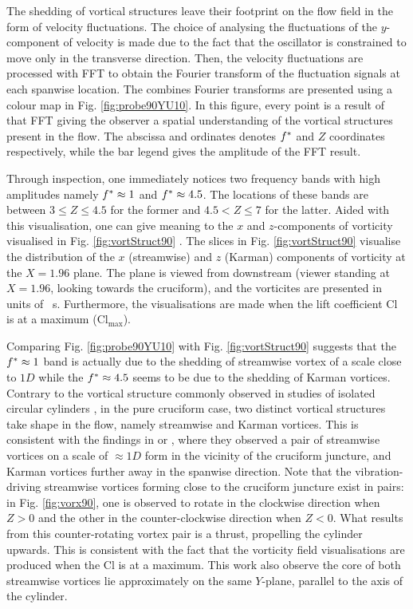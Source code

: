 \documentclass[oneside]{utmthesis}
\begin{document}
The shedding of vortical structures leave their footprint on the flow field in the form of velocity fluctuations. The choice of analysing the fluctuations of the $y$-component of velocity is made due to the fact that the oscillator is constrained to move only in the transverse direction. Then, the velocity fluctuations are processed with FFT to obtain the Fourier transform of the fluctuation signals at each spanwise location. The combines Fourier transforms are presented using a colour map in Fig. \ref{fig:probe90YU10}. In this figure, every point is a result of that FFT giving the observer a spatial understanding of the vortical structures present in the flow. The abscissa and ordinates denotes $f^{*}$ and $Z$ coordinates respectively, while the bar legend gives the amplitude of the FFT result.

Through inspection, one immediately notices two frequency bands with high amplitudes namely $f^{*} \approx 1$ and $f^{*} \approx 4.5$. The locations of these bands are between $3 \leq Z \leq 4.5$ for the former and $4.5 < Z \leq 7$ for the latter. Aided with this visualisation, one can give meaning to the $x$ and $z$-components of vorticity visualised in Fig. \ref{fig:vortStruct90} . The slices in Fig. \ref{fig:vortStruct90} visualise the distribution of the $x$ (streamwise) and $z$ (Karman) components of vorticity at the $X = 1.96$ plane. The plane is viewed from downstream (viewer standing at $X = 1.96$, looking towards the cruciform), and the vorticites are presented in units of \si{\per\second}. Furthermore, the visualisations are made when the lift coefficient Cl is at a maximum ($\text{Cl}_{\text{max}}$).

Comparing Fig. \ref{fig:probe90YU10} with Fig. \ref{fig:vortStruct90} suggests that the $f^{*} \approx 1$ band is actually due to the shedding of streamwise vortex of a scale close to $1D$ while the $f^{*} \approx 4.5$ seems to be due to the shedding of Karman vortices. Contrary to the vortical structure commonly observed in studies of isolated circular cylinders \citep{Deng2007,Kinaci2016,Duranay2020}, in the pure cruciform case, two distinct vortical structures take shape in the flow, namely streamwise and Karman vortices. This is consistent with the findings in \citet{Koide2017} or \citet{Zhao2018a}, where they observed a pair of streamwise vortices on a scale of $\approx 1D$ form in the vicinity of the cruciform juncture, and Karman vortices further away in the spanwise direction. Note that the vibration-driving streamwise vortices forming close to the cruciform juncture exist in pairs: in Fig. \ref{fig:vorx90}, one is observed to rotate in the clockwise direction when $Z > 0$ and the other in the counter-clockwise direction when $Z < 0$. What results from this counter-rotating vortex pair is a thrust, propelling the cylinder upwards. This is consistent with the fact that the vorticity field visualisations are produced when the Cl is at a maximum. This work also observe the core of both streamwise vortices lie approximately on the same $Y$-plane, parallel to the axis of the cylinder.
\end{document}

